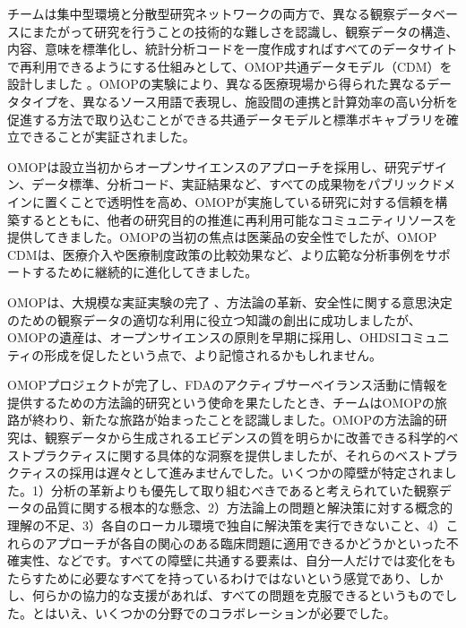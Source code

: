 \documentclass[
  11pt]{book}
\theoremstyle{definition}
\theoremstyle{definition}
\theoremstyle{definition}
\theoremstyle{definition}
\theoremstyle{remark}
\begin{document}
チームは集中型環境と分散型研究ネットワークの両方で、異なる観察データベースにまたがって研究を行うことの技術的な難しさを認識し、観察データの構造、内容、意味を標準化し、統計分析コードを一度作成すればすべてのデータサイトで再利用できるようにする仕組みとして、OMOP共通データモデル（CDM）を設計しました \citep{overhage2012cdm} 。OMOPの実験により、異なる医療現場から得られた異なるデータタイプを、異なるソース用語で表現し、施設間の連携と計算効率の高い分析を促進する方法で取り込むことができる共通データモデルと標準ボキャブラリを確立できることが実証されました。

OMOPは設立当初からオープンサイエンスのアプローチを採用し、研究デザイン、データ標準、分析コード、実証結果など、すべての成果物をパブリックドメインに置くことで透明性を高め、OMOPが実施している研究に対する信頼を構築するとともに、他者の研究目的の推進に再利用可能なコミュニティリソースを提供してきました。OMOPの当初の焦点は医薬品の安全性でしたが、OMOP CDMは、医療介入や医療制度政策の比較効果など、より広範な分析事例をサポートするために継続的に進化してきました。

OMOPは、大規模な実証実験の完了\citep{ryan2012omop, ryan2013omop} 、方法論の革新\citep{schuemie_2014}、安全性に関する意思決定のための観察データの適切な利用に役立つ知識の創出\citep{madigan_2013, madigan2013design}に成功しましたが、OMOPの遺産は、オープンサイエンスの原則を早期に採用し、OHDSIコミュニティの形成を促したという点で、より記憶されるかもしれません。

OMOPプロジェクトが完了し、FDAのアクティブサーベイランス活動に情報を提供するための方法論的研究という使命を果たしたとき、チームはOMOPの旅路が終わり、新たな旅路が始まったことを認識しました。OMOPの方法論的研究は、観察データから生成されるエビデンスの質を明らかに改善できる科学的ベストプラクティスに関する具体的な洞察を提供しましたが、それらのベストプラクティスの採用は遅々として進みませんでした。いくつかの障壁が特定されました。1）分析の革新よりも優先して取り組むべきであると考えられていた観察データの品質に関する根本的な懸念、2）方法論上の問題と解決策に対する概念的理解の不足、3）各自のローカル環境で独自に解決策を実行できないこと、4）これらのアプローチが各自の関心のある臨床問題に適用できるかどうかといった不確実性、などです。すべての障壁に共通する要素は、自分一人だけでは変化をもたらすために必要なすべてを持っているわけではないという感覚であり、しかし、何らかの協力的な支援があれば、すべての問題を克服できるというものでした。とはいえ、いくつかの分野でのコラボレーションが必要でした。
\end{document}
